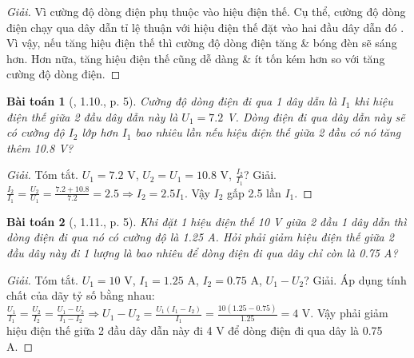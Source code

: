 \documentclass{article}
\newtheorem{baitoan}{Bài toán}
\begin{document}
\begin{proof}[Giải]
	Vì cường độ dòng điện phụ thuộc vào hiệu điện thế. Cụ thể, cường độ dòng điện chạy qua dây dẫn tỉ lệ thuận với hiệu điện thế đặt vào hai đầu dây dẫn đó . Vì vậy, nếu tăng hiệu điện thế thì cường độ dòng điện tăng \& bóng đèn sẽ sáng hơn. Hơn nữa, tăng hiệu điện thế cũng dễ dàng \& ít tốn kém hơn so với tăng cường độ dòng điện.
\end{proof}

\begin{baitoan}[\cite{SBT_Vat_Ly_9}, 1.10., p. 5]
	Cường độ dòng điện đi qua 1 dây dẫn là $I_1$ khi hiệu điện thế giữa 2 đầu dây dẫn này là $U_1 = 7.2$ \emph{V}. Dòng điện đi qua dây dẫn này sẽ có cường độ $I_2$ lớp hơn $I_1$ bao nhiêu lần nếu hiệu điện thế giữa 2 đầu có nó tăng thêm \emph{10.8 V}?
\end{baitoan}

\begin{proof}[Giải]
	\textsf{Tóm tắt.} $U_1 = 7.2$ V, $U_2 = U_1 = 10.8$ V, $\frac{I_2}{I_1}$? \textsf{Giải.} $\frac{I_2}{I_1} = \frac{U_2}{U_1} = \frac{7.2 + 10.8}{7.2} = 2.5\Rightarrow I_2 = 2.5I_1$. Vậy $I_2$ gấp 2.5 lần $I_1$.
\end{proof}

\begin{baitoan}[\cite{SBT_Vat_Ly_9}, 1.11., p. 5]
	Khi đặt 1 hiệu điện thế \emph{10 V} giữa 2 đầu 1 dây dẫn thì dòng điện đi qua nó có cường độ là \emph{1.25 A}. Hỏi phải giảm hiệu điện thế giữa 2 đầu dây này đi 1 lượng là bao nhiêu để dòng điện đi qua dây chỉ còn là \emph{0.75 A}?
\end{baitoan}

\begin{proof}[Giải]
	\textsf{Tóm tắt.} $U_1 = 10$ V, $I_1 = 1.25$ A, $I_2 = 0.75$ A, $U_1 - U_2$? \textsf{Giải.} Áp dụng tính chất của dãy tỷ số bằng nhau: $\frac{U_1}{I_1} = \frac{U_2}{I_2} = \frac{U_1 - U_2}{I_1 - I_2}\Rightarrow U_1 - U_2 = \frac{U_1(I_1 - I_2)}{I_1} = \frac{10(1.25 - 0.75)}{1.25} = 4$ V. Vậy phải giảm hiệu điện thế giữa 2 đầu dây dẫn này đi 4 V để dòng điện đi qua dây là 0.75 A.
\end{proof}
\end{document}
